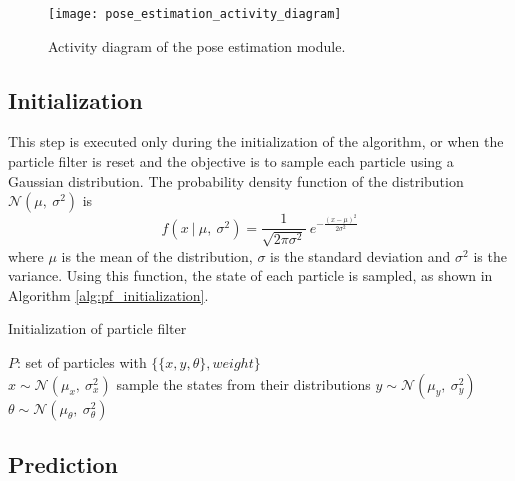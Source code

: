 \begin{figure}[h!]
    \centering
    \texttt{[image: pose\_estimation\_activity\_diagram]}
    \decoRule
    \caption[Pose estimation activity diagram]{
        Activity diagram of the pose estimation module.
    }
    \label{fig:pose_estimation_activity_diagram}
\end{figure}

\subsection{Initialization}

This step is executed only during the initialization of the algorithm,
or when the particle filter is reset and the objective is to sample
each particle using a Gaussian distribution.
The probability density function of the distribution
$\mathcal{N}(\mu, \ \sigma^2)$ is
\begin{equation}
    f(x \ | \ \mu ,\ \sigma^2) =
    \frac{1}{\sqrt{2\pi\sigma^2}} \
    e^{ -\frac{(x-\mu)^2}{2\sigma^2} }
\end{equation}
where
$\mu$ is the mean of the distribution,
$\sigma$ is the standard deviation and
$\sigma^2$ is the variance.
Using this function, the state of each particle is sampled, as shown in
Algorithm \ref{alg:pf_initialization}.

\begin{algorithm}
    \caption{Initialization of particle filter}
    \label{alg:pf_initialization}
    \begin{algorithmic}[1]
        \State $P$: set of particles with $\{\{x, y, \theta\}, weight\}$ \\

            \State $x \sim \mathcal{N}(\mu_x, \ \sigma^2_x)$
            \Comment sample the states from their distributions
            \State $y \sim \mathcal{N}(\mu_y, \ \sigma^2_y)$
            \State $\theta \sim \mathcal{N}(\mu_\theta, \ \sigma^2_\theta)$
        \EndFor
    \end{algorithmic}
\end{algorithm}

\subsection{Prediction} \label{pf_prediction}

